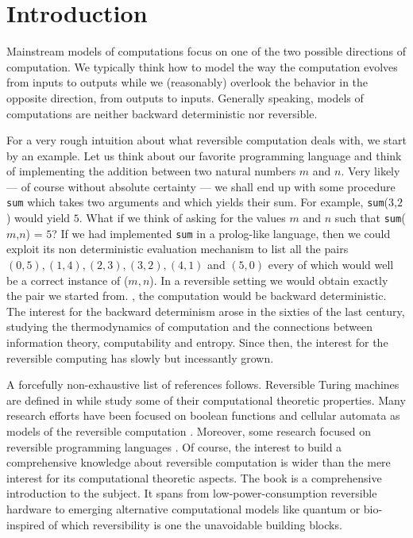 \section{Introduction}\label{section:Introduction}

Mainstream models of computations focus on one of the two possible directions of computation. 
We typically think how to model 
the way the computation evolves from inputs to outputs while 
we (reasonably) overlook the behavior in the opposite direction, from outputs to inputs. 
Generally speaking, models of computations are neither backward deterministic nor reversible.

For a very rough intuition about what reversible computation deals with, we start by an example.
Let us think about our favorite programming language and think of implementing the
addition between two natural numbers
$ m $ and $ n $. Very likely --- of course without absolute certainty --- we 
shall end up with some procedure \texttt{sum} which takes two arguments and which yields their sum. 
For example, \texttt{sum}($ 3 $,$ 2 $) would yield $ 5 $.
What if we think of asking for the values $ m $ and $ n $ such that \texttt{sum}($ m $,$ n $) = $ 5 $?
If we had implemented \texttt{sum} in a prolog-like language, then we could exploit its 
non deterministic evaluation mechanism to list all the pairs $ (0,5), (1,4), (2,3), (3,2), (4,1) $ and
$ (5,0) $ every of which would well be a correct instance of ($ m, n $). 
In a reversible setting we would obtain
exactly the pair we started from. \Ie, the computation would be backward deterministic.
The interest for the backward determinism arose in the sixties of the last century, 
studying the thermodynamics of computation and the connections between information theory, computability and entropy. 
Since then, the interest for the reversible computing has slowly but incessantly grown.

A forcefully non-exhaustive list of references follows.
Reversible Turing machines are defined in \cite{axelsen11lncs,bennett73ibm,jacopini90siam,lecerf63} while
\cite{axelsen11lncs,axelsen16acta,jacopini89tcs,li1996royal} 
study some of their computational theoretic properties.
Many research efforts have been focused on  boolean functions and cellular 
automata as models of the reversible
computation \cite{Morita2008101,toffoli80lncs}.
Moreover, some research focused on reversible programming languages \cite{DBLP:conf/popl/JamesS12,yokoyama08acm}.
Of course, the interest to build a comprehensive knowledge about reversible computation is wider than 
the mere interest for its computational theoretic aspects. 
The book \cite{perumalla2013chc} is a comprehensive 
introduction to the subject. It spans from low-power-consumption reversible hardware to emerging alternative computational
models like quantum  \cite{guerriniMM15,zorzi14mscs} or bio-inspired \cite{giannini2015tcs} of which reversibility is one the unavoidable building blocks.

